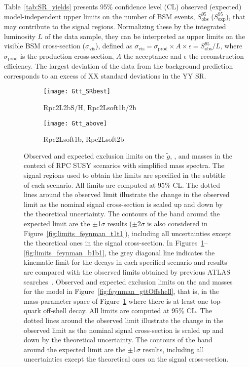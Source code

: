 Table~\ref{tab:SR_yields} presents 95\% confidence level (CL) observed (expected) model-independent upper limits 
on the number of BSM events, $S_{\textrm{obs}}^{95}$ ($S_{\textrm{exp}}^{95}$), that may contribute to the signal regions. 
Normalizing these by the integrated luminosity $L$ of the data sample, they can be interpreted as upper limits on the visible 
BSM cross-section ($\sigma_{\textrm{vis}}$), defined as $\sigma_{\textrm{vis}}=\sigma_{\textrm{prod}}\times A \times\epsilon=S_{\textrm{obs}}^{95}/L$, where 
$\sigma_{\textrm{prod}}$ is the production cross-section, $A$ the acceptance and $\epsilon$ the reconstruction efficiency. The largest 
deviation of the data from the background prediction corresponds to an excess of XX standard deviations in the YY SR.

\begin{figure}[p]
\centering
\begin{subfigure}[t]{0.45\textwidth}\texttt{[image: Gtt\_SRbest]}\caption{Rpc2L2bS/H, Rpc2Lsoft1b/2b}\label{fig:limits_feynman_gtt}\end{subfigure}
\begin{subfigure}[t]{0.45\textwidth}\texttt{[image: Gtt\_above]}\caption{Rpc2Lsoft1b, Rpc2Lsoft2b}\label{fig:limits_feynman_gttOffshell}\end{subfigure}
\caption{Observed and expected exclusion limits on the $\tilde{g}$, \sbottomone, \stopone and \ninoone masses 
in the context of RPC SUSY scenarios with simplified mass spectra. The signal regions used to obtain the limits are specified in the subtitle of 
each scenario. All limits are computed at 95\% CL. The dotted lines around the observed
limit illustrate the change in the observed limit as the nominal signal cross-section is scaled up and down
by the theoretical uncertainty. The contours of the band around the expected 
limit are the $\pm$1$\sigma$ results ($\pm$2$\sigma$ is also considered in Figure~\ref{fig:limits_feynman_t1t1}), 
including all uncertainties except the theoretical ones in the signal cross-section. In Figures~\ref{fig:limits_feynman_gtt}--\ref{fig:limits_feynman_b1b1}, 
the grey diagonal line indicates the kinematic limit for the decays in each specified scenario and results are compared with the observed limits obtained 
by previous ATLAS searches~\cite{paperSS3L,Aad:2016jxj}.
Observed and expected exclusion limits on the \gluino and \ninoone masses for the model in Figure~\ref{fig:feynman_gttOffshell}, 
that is, in the mass-parameter space of Figure~\ref{fig:limits_feynman_gtt} where there is at least one top-quark off-shell decay. 
All limits are computed at 95\% CL. The dotted lines around the observed limit illustrate the change in the observed limit as the 
nominal signal cross-section is scaled up and down by the theoretical uncertainty. The contours of the band around the expected 
limit are the $\pm$1$\sigma$ results, including all uncertainties except the theoretical ones on the signal cross-section.
}
\label{fig:Results_Limits_RPC} 
\end{figure} 


